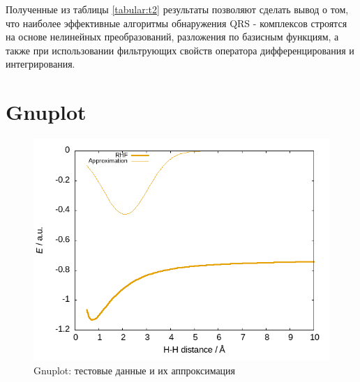 \documentclass[a4paper,12pt]{article}         %
\begin{document}
Полученные из таблицы \ref{tabular:t2} результаты позволяют сделать вывод о том, что наиболее эффективные алгоритмы обнаружения QRS - комплексов строятся на основе нелинейных преобразований, разложения по базисным функциям, а также при использовании фильтрующих свойств оператора дифференцирования и интегрирования.

\newpage
\section{Gnuplot}
\begin{figure}[h]
	\centering
	\includegraphics[width=0.8\linewidth]{plot.png}
	\smallskip
	\caption{Gnuplot: тестовые данные и их аппроксимация}
	\label{graph}
\end{figure}


\newpage

\end{document}
